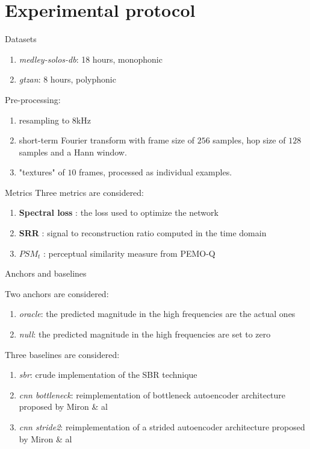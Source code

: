 \documentclass[compress]{beamer}
\begin{document}
\section{Experimental protocol}

\begin{frame}{Datasets}
\begin{enumerate}
  \item \textit{medley-solos-db}: 18 hours, monophonic
  \item \textit{gtzan}: 8 hours, polyphonic
\end{enumerate}
Pre-processing:

\begin{enumerate}
  \item resampling to $8$kHz
  \item short-term Fourier transform with frame size of $256$ samples, hop size of $128$ samples and a Hann window.
  \item "textures" of $10$ frames, processed as individual examples.
\end{enumerate}
\end{frame}

\begin{frame}{Metrics}
Three metrics are considered:
\begin{enumerate}
  \item \textbf{Spectral loss} : the loss used to optimize the network
  \item \textbf{SRR} : signal to reconstruction ratio computed in the time domain
  \item \textbf{$PSM_t$} : perceptual similarity measure from PEMO-Q 
\end{enumerate}
\end{frame}

\begin{frame}{Anchors and baselines}

Two anchors are considered:
\begin{enumerate}
  \item \textit{oracle}: the predicted magnitude in the high frequencies are the actual ones
  \item \textit{null}: the predicted magnitude in the high frequencies are set to zero
\end{enumerate}

Three baselines are considered:
\begin{enumerate}
  \item \textit{sbr}: crude implementation of the SBR technique
  \item \textit{cnn bottleneck}: reimplementation of bottleneck autoencoder architecture proposed by Miron \& al
  \item \textit{cnn stride2}: reimplementation of a strided autoencoder architecture proposed by Miron \& al 
\end{enumerate}
\end{frame}
\end{document}
